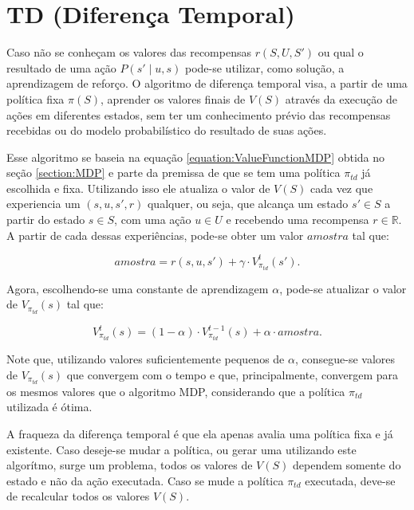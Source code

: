 \section{TD (Diferença Temporal)} \label{section:TD}

Caso não se conheçam os valores das recompensas $ r \left( S, U, S' \right) $ ou qual o resultado de uma ação $ P \left( s' \mid u, s \right) $ pode-se utilizar, como solução, a aprendizagem de reforço. O algoritmo de diferença temporal visa, a partir de uma política fixa $ \pi \left( S \right) $, aprender os valores finais de $ V \left( S \right) $ através da execução de ações em diferentes estados, sem ter um conhecimento prévio das recompensas recebidas ou do modelo probabilístico do resultado de suas ações.

Esse algoritmo se baseia na equação \ref{equation:ValueFunctionMDP} obtida no seção \ref{section:MDP} e parte da premissa de que se tem uma política $ \pi_{td} $ já escolhida e fixa. Utilizando isso ele atualiza o valor de $ V \left( S \right) $ cada vez que experiencia um $ \left( s, u, s', r \right) $ qualquer, ou seja, que alcança um estado $ s' \in S $ a partir do estado $ s \in S $, com uma ação $ u \in U $ e recebendo uma recompensa $ r \in \mathbb{R} $. A partir de cada dessas experiências, pode-se obter um valor $ amostra $ tal que:

\begin{equation} \label{equation:AmostraTD}
	amostra = r \left( s, u, s' \right) + \gamma \cdot V_{\pi_{td}}^t \left( s' \right).
\end{equation}

Agora, escolhendo-se uma constante de aprendizagem $ \alpha $, pode-se atualizar o valor de $ V_{\pi_{td}} \left( s \right) $ tal que:

\begin{equation} \label{equation:UpdateValueFunctionTD}
	V_{\pi_{td}}^t \left( s \right) = \left( 1 - \alpha \right) \cdot V_{\pi_{td}}^{t-1} \left( s \right) + \alpha \cdot amostra.
\end{equation}

Note que, utilizando valores suficientemente pequenos de $ \alpha $, consegue-se valores de $ V_{\pi_{td}} \left( s \right) $ que convergem com o tempo e que, principalmente, convergem para os mesmos valores que o algoritmo MDP, considerando que a política $ \pi_{td} $ utilizada é ótima.

A fraqueza da diferença temporal é que ela apenas avalia uma política fixa e já existente. Caso deseje-se mudar a política, ou gerar uma utilizando este algorítmo, surge um problema, todos os valores de $ V \left( S \right) $ dependem somente do estado e não da ação executada. Caso se mude a política $ \pi_{td} $ executada, deve-se de recalcular todos os valores $ V \left( S \right) $.

